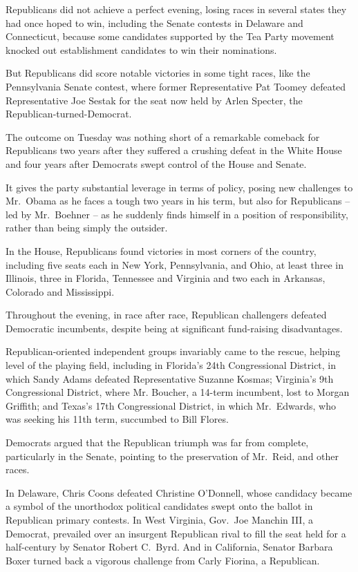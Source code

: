 ﻿\documentclass[12pt]{article}
\begin{document}
Republicans did not achieve a perfect evening, losing races in several states they had once hoped to
win, including the Senate contests in Delaware and Connecticut, because some candidates supported by
the Tea Party movement knocked out establishment candidates to win their nominations.

But Republicans did score notable victories in some tight races, like the Pennsylvania Senate
contest, where former Representative Pat Toomey defeated Representative Joe Sestak for the seat now
held by Arlen Specter, the Republican-turned-Democrat.

The outcome on Tuesday was nothing short of a remarkable comeback for Republicans two years after
they suffered a crushing defeat in the White House and four years after Democrats swept control of
the House and Senate.

It gives the party substantial leverage in terms of policy, posing new challenges to Mr.~Obama as he
faces a tough two years in his term, but also for Republicans -- led by Mr.~Boehner -- as he
suddenly finds himself in a position of responsibility, rather than being simply the outsider.

In the House, Republicans found victories in most corners of the country, including five seats each
in New York, Pennsylvania, and Ohio, at least three in Illinois, three in Florida, Tennessee and
Virginia and two each in Arkansas, Colorado and Mississippi.

Throughout the evening, in race after race, Republican challengers defeated Democratic incumbents,
despite being at significant fund-raising disadvantages.

Republican-oriented independent groups invariably came to the rescue, helping level of the playing
field, including in Florida's 24th Congressional District, in which Sandy Adams defeated
Representative Suzanne Kosmas; Virginia's 9th Congressional District, where Mr. Boucher, a 14-term
incumbent, lost to Morgan Griffith; and Texas's 17th Congressional District, in which Mr.~Edwards,
who was seeking his 11th term, succumbed to Bill Flores.

Democrats argued that the Republican triumph was far from complete, particularly in the Senate,
pointing to the preservation of Mr.~Reid, and other races.

In Delaware, Chris Coons defeated Christine O'Donnell, whose candidacy became a symbol of the
unorthodox political candidates swept onto the ballot in Republican primary contests. In West
Virginia, Gov.~Joe Manchin III, a Democrat, prevailed over an insurgent Republican rival to fill the
seat held for a half-century by Senator Robert C.~Byrd. And in California, Senator Barbara Boxer
turned back a vigorous challenge from Carly Fiorina, a Republican.
\end{document}
